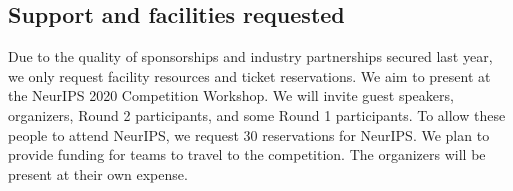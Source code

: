 \subsection{Support and facilities requested}
Due to the quality of sponsorships and industry partnerships secured last year, we only request facility resources and ticket reservations. 
We aim to present at the NeurIPS 2020 Competition Workshop.
We will invite guest speakers, organizers, Round 2 participants, and some Round 1 participants.
To allow these people to attend NeurIPS, we request 30 reservations for NeurIPS. 
We plan to provide funding for teams to travel to the competition.
The organizers will be present at their own expense.


\newpage 